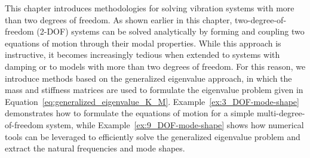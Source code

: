\documentclass[12pt,letter]{article}
\begin{document}
This chapter introduces methodologies for solving vibration systems with more than two degrees of freedom. As shown earlier in this chapter, two-degree-of-freedom (2-DOF) systems can be solved analytically by forming and coupling two equations of motion through their modal properties. While this approach is instructive, it becomes increasingly tedious when extended to systems with damping or to models with more than two degrees of freedom. For this reason, we introduce methods based on the generalized eigenvalue approach, in which the mass and stiffness matrices are used to formulate the eigenvalue problem given in Equation~\ref{eq:generalized_eigenvalue_K_M}. Example~\ref{ex:3_DOF-mode-shape} demonstrates how to formulate the equations of motion for a simple multi-degree-of-freedom system, while Example~\ref{ex:9_DOF-mode-shape} shows how numerical tools can be leveraged to efficiently solve the generalized eigenvalue problem and extract the natural frequencies and mode shapes.
 
 \pagebreak
\end{document}
